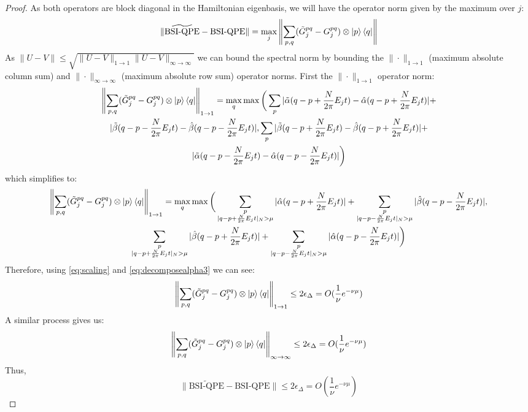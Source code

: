 \documentclass[aps,floatfix,10pt,amssymb,amsfont,amsmath,superscriptaddress,float,nofootinbib,longbibliography,nobalancelastpage,twocolumn]{revtex4-2}
\begin{document}
\begin{proof}
    As both operators are block diagonal in the Hamiltonian eigenbasis, we will have the operator norm given by the maximum over $j$:
    \begin{equation}
        \|\widetilde{\text{BSI-QPE}}-\text{BSI-QPE}\| = \max_j 
        \left\|\sum_{p,q}(\tilde G^{pq}_j - G^{pq}_j) \otimes \ket{p}\bra{q}\right\|
    \end{equation}
    As $\|U-V\| \leq \sqrt{\|U-V\|_{1\to1}\|U-V\|_{\infty\to\infty}}$ we can bound the spectral norm by bounding the $\|\cdot\|_{1\to1}$ (maximum absolute column sum) and $\|\cdot\|_{\infty\to\infty}$ (maximum absolute row sum) operator norms. First the $\|\cdot\|_{1\to1}$  operator norm:
    \begin{multline}
         \left\|\sum_{p,q}(\tilde G^{pq}_j - G^{pq}_j) \otimes \ket{p}\bra{q}\right\|_{1\to1} = \max_q \max\bigg(\sum_{p}|\tilde\alpha(q-p+\frac{N}{2\pi}E_jt)-\hat\alpha(q-p+\frac{N}{2\pi}E_jt)|+\\|\tilde\beta (q-p-\frac{N}{2\pi}E_jt)-\hat\beta (q-p-\frac{N}{2\pi}E_jt)|, \sum_{p}|\tilde\beta(q-p+\frac{N}{2\pi}E_jt)-\hat\beta(q-p+\frac{N}{2\pi}E_jt)|+\\|\tilde\alpha (q-p-\frac{N}{2\pi}E_jt)-\hat\alpha (q-p-\frac{N}{2\pi}E_jt)|\bigg)
    \end{multline}
    which simplifies to:
    \begin{multline}
         \left\|\sum_{p,q}(\tilde G^{pq}_j - G^{pq}_j) \otimes \ket{p}\bra{q}\right\|_{1\to1} = \max_q\max\bigg(\sum_{\substack{p\\|q-p+\frac{N}{2\pi}E_jt|_{N}>\mu}}|\hat\alpha(q-p+\frac{N}{2\pi}E_jt)|+\sum_{\substack{p\\|q-p-\frac{N}{2\pi}E_jt|_{N}>\mu}}|\hat\beta (q-p-\frac{N}{2\pi}E_jt)|,\\
         \sum_{\substack{p\\|q-p+\frac{N}{2\pi}E_jt|_{N}>\mu}}|\hat\beta(q-p+\frac{N}{2\pi}E_jt)|+\sum_{\substack{p\\|q-p-\frac{N}{2\pi}E_jt|_{N}>\mu}}|\hat\alpha (q-p-\frac{N}{2\pi}E_jt)|\bigg)
    \end{multline}
    Therefore, using \eqref{eq:scaling} and \eqref{eq:decomposealpha3}  we can see:
    \begin{equation}
        \left\|\sum_{p,q}(\tilde G^{pq}_j - G^{pq}_j) \otimes \ket{p}\bra{q}\right\|_{1\to1} \leq 2\epsilon_{\Delta} = O(\frac{1}{\nu}e^{-\nu \mu})
    \end{equation}
    A similar process gives us:
    \begin{equation}
        \left\|\sum_{p,q}(\tilde G^{pq}_j - G^{pq}_j) \otimes \ket{p}\bra{q}\right\|_{\infty\to\infty} \leq 2\epsilon_{\Delta} =O(\frac{1}{\nu}e^{-\nu \mu})
    \end{equation}
    Thus,
    \begin{equation}
        \|\widetilde{\text{BSI-QPE}}-\text{BSI-QPE}\| \leq 2\epsilon_{\Delta} = O\left(\frac{1}{\nu}e^{-\nu \mu}\right)
    \end{equation}
\end{proof}
\end{document}
